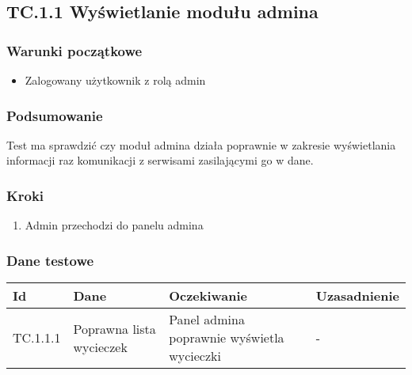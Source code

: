 \documentclass[a4paper,15pt]{article}
\begin{document}
\begin{framed}
\subsection{TC.1.1 Wyświetlanie modułu admina}

\vspace{0.5cm}

\subsubsection{Warunki początkowe}
\begin{itemize}
\item Zalogowany użytkownik z rolą admin
\end{itemize}

\subsubsection{Podsumowanie}
Test ma sprawdzić czy moduł admina działa poprawnie w zakresie wyświetlania informacji raz komunikacji z serwisami zasilającymi go w dane.

\subsubsection{Kroki}
\begin{enumerate}
\item Admin przechodzi do panelu admina
\end{enumerate}

\subsubsection{Dane testowe}

\begin{center}
\begin{tabular}{ |C{1.5cm}|C{3cm}|C{4cm}|C{4cm}| } 
 \hline
 \textbf{Id} & \textbf{Dane} & \textbf{Oczekiwanie} & \textbf{Uzasadnienie} \\ \hline
 TC.1.1.1 & Poprawna lista wycieczek & Panel admina poprawnie wyświetla wycieczki & - \\ \hline
\end{tabular}
\end{center}
\end{framed}
\end{document}
